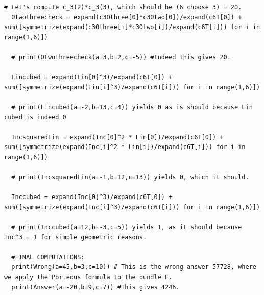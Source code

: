 \documentclass{article}
\begin{document}
\begin{lstlisting}[basicstyle=\ttfamily\tiny]
  # Let's compute c_3(2)*c_3(3), which should be (6 choose 3) = 20.
  Otwothreecheck = expand(c3Othree[0]*c3Otwo[0])/expand(c6T[0]) + sum([symmetrize(expand(c3Othree[i]*c3Otwo[i])/expand(c6T[i])) for i in range(1,6)])
  
  # print(Otwothreecheck(a=3,b=2,c=-5)) #Indeed this gives 20.
  
  Lincubed = expand(Lin[0]^3)/expand(c6T[0]) + sum([symmetrize(expand(Lin[i]^3)/expand(c6T[i])) for i in range(1,6)])
  
  # print(Lincubed(a=-2,b=13,c=4)) yields 0 as is should because Lin cubed is indeed 0
  
  IncsquaredLin = expand(Inc[0]^2 * Lin[0])/expand(c6T[0]) + sum([symmetrize(expand(Inc[i]^2 * Lin[i])/expand(c6T[i])) for i in range(1,6)])
  
  # print(IncsquaredLin(a=-1,b=12,c=13)) yields 0, which it should. 
  
  Inccubed = expand(Inc[0]^3)/expand(c6T[0]) + sum([symmetrize(expand(Inc[i]^3)/expand(c6T[i])) for i in range(1,6)])
  
  # print(Inccubed(a=12,b=-3,c=5)) yields 1, as it should because Inc^3 = 1 for simple geometric reasons.
  
  #FINAL COMPUTATIONS:
  print(Wrong(a=45,b=3,c=10)) # This is the wrong answer 57728, where we apply the Porteous formula to the bundle E.
  print(Answer(a=-20,b=9,c=7)) #This gives 4246.
\end{lstlisting}





  

  
\end{document}
